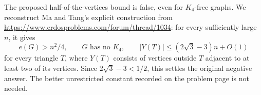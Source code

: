 The proposed half-of-the-vertices bound is false, even for $K_4$-free graphs. We reconstruct Ma and Tang's explicit construction from \url{https://www.erdosproblems.com/forum/thread/1034}: for every sufficiently large $n$, it gives
\[
 e(G)>n^2/4,\qquad G\text{ has no }K_4,\qquad
 |Y(T)|\le(2\sqrt3-3)n+O(1)
\tag{1}
\]
for every triangle $T$, where $Y(T)$ consists of vertices outside $T$ adjacent to at least two of its vertices. Since $2\sqrt3-3<1/2$, this settles the original negative answer. The better unrestricted constant recorded on the problem page is not needed.

